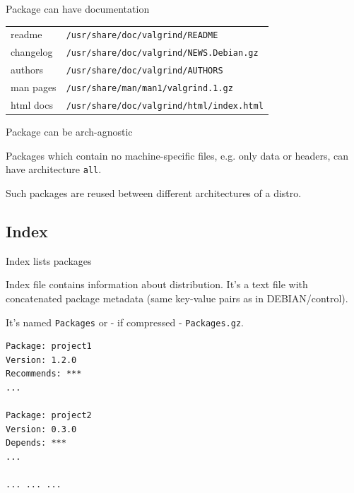 \documentclass{beamer}
\begin{document}
\begin{frame}[fragile]{Package can have documentation}
    \begin{block}{}
        \renewcommand{\arraystretch}{1.5}
        \begin{tabular}{l l}
            readme & \small\verb|/usr/share/doc/valgrind/README| \\
            changelog & \small\verb|/usr/share/doc/valgrind/NEWS.Debian.gz| \\
            authors & \small\verb|/usr/share/doc/valgrind/AUTHORS| \\
            man pages & \small\verb|/usr/share/man/man1/valgrind.1.gz| \\
            html docs & \small\verb|/usr/share/doc/valgrind/html/index.html| \\
        \end{tabular}
    \end{block}
\end{frame}

\begin{frame}[fragile]{Package can be arch-agnostic}
    \begin{block}{}
        Packages which contain no machine-specific files,
        e.g. only data or headers, can have architecture \verb|all|.
    \end{block}
    \begin{block}{}
        Such packages are reused
        between different architectures of a distro.
    \end{block}
\end{frame}

\subsection{Index}

\begin{frame}[fragile]{Index lists packages}
    \begin{block}{}
        Index file contains information about distribution.
        It's a text file with concatenated package metadata
        (same key-value pairs as in DEBIAN/control).
    \end{block}
    \begin{block}{}
        It's named \verb|Packages| or - if compressed - \verb|Packages.gz|.
    \end{block}
\begin{lstlisting}[style=Console]
Package: project1
Version: 1.2.0
Recommends: ***
...

Package: project2
Version: 0.3.0
Depends: ***
...

... ... ...
\end{lstlisting}
\end{frame}
\end{document}

